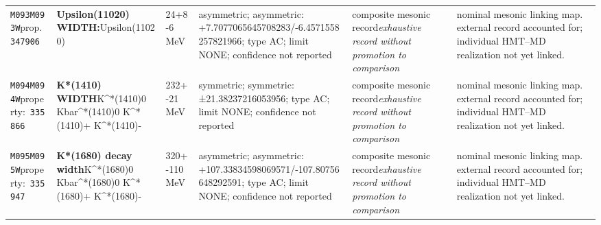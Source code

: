 \begin{landscape}
\begin{longtable}{L{1.85cm}L{4.45cm}L{2.35cm}L{4.05cm}L{3.35cm}L{7.15cm}}
\texttt{M093}\newline \texttt{M093W}\newline prop.\ \texttt{347906} & \textbf{Upsilon(11020) WIDTH:}\newline Upsilon(11020) & 24+8-6\,MeV & asymmetric; asymmetric: +7.7077065645708283/-6.4571558257821966; type AC; limit NONE; confidence not reported & composite mesonic record\newline \emph{exhaustive record without promotion to comparison} & nominal mesonic linking map. external record accounted for; individual HMT--MD realization not yet linked. \\
\texttt{M094}\newline \texttt{M094W}\newline property:\ \texttt{335866} & \textbf{K*(1410) WIDTH}\newline K\textasciicircum{}*(1410)0 \textbar{}\allowbreak{} Kbar\textasciicircum{}*(1410)0 \textbar{}\allowbreak{} K\textasciicircum{}*(1410)+ \textbar{}\allowbreak{} K\textasciicircum{}*(1410)- & 232+-21\,MeV & symmetric; symmetric: ±21.38237216053956; type AC; limit NONE; confidence not reported & composite mesonic record\newline \emph{exhaustive record without promotion to comparison} & nominal mesonic linking map. external record accounted for; individual HMT--MD realization not yet linked. \\
\texttt{M095}\newline \texttt{M095W}\newline property:\ \texttt{335947} & \textbf{K*(1680) decay width}\newline K\textasciicircum{}*(1680)0 \textbar{}\allowbreak{} Kbar\textasciicircum{}*(1680)0 \textbar{}\allowbreak{} K\textasciicircum{}*(1680)+ \textbar{}\allowbreak{} K\textasciicircum{}*(1680)- & 320+-110\,MeV & asymmetric; asymmetric: +107.33834598069571/-107.80756648292591; type AC; limit NONE; confidence not reported & composite mesonic record\newline \emph{exhaustive record without promotion to comparison} & nominal mesonic linking map. external record accounted for; individual HMT--MD realization not yet linked. \\

\end{longtable}
\end{landscape}
